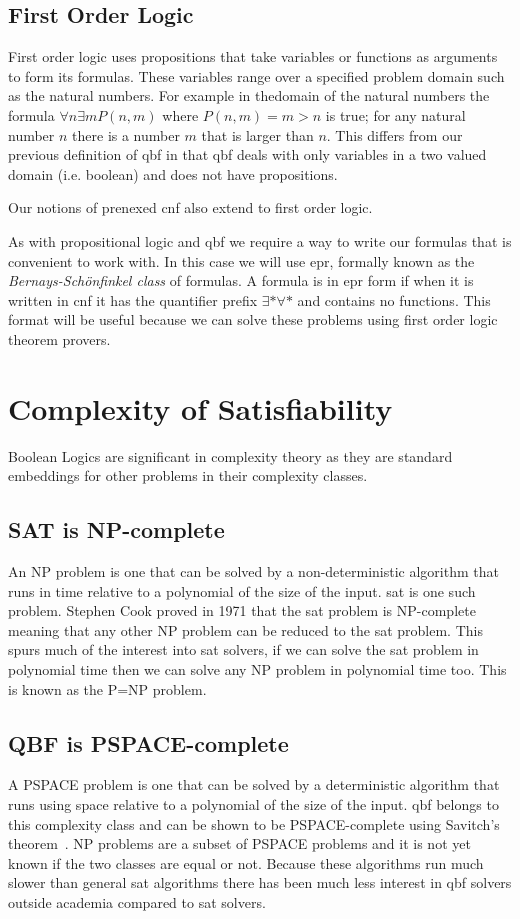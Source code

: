 \subsection{First Order Logic}
First order logic uses propositions that take variables or functions as arguments to form its formulas. These variables range over a specified problem domain such as the natural numbers. For example in thedomain of the natural numbers the formula $\forall n \exists m P(n, m)$ where $P(n, m) = m > n$ is true; for any natural number $n$ there is a number $m$ that is larger than $n$. This differs from our previous definition of \gls{qbf} in that \gls{qbf} deals with only variables in a two valued domain (i.e. boolean) and does not have propositions.

Our notions of prenexed \gls{cnf} also extend to first order logic.

As with propositional logic and \gls{qbf} we require a way to write our formulas that is convenient to work with. In this case we will use \gls{epr}, formally known as the \textit{Bernays-Sch{\"o}nfinkel class} of formulas. A formula is in \gls{epr} form if when it is written in \gls{cnf} it has the quantifier prefix $\exists * \forall *$ and contains no functions. This format will be useful because we can solve these problems using first order logic theorem provers.

\section{Complexity of Satisfiability}
Boolean Logics are significant in complexity theory as they are standard embeddings for other problems in their complexity classes.

\subsection{SAT is NP-complete}
An NP problem is one that can be solved by a non-deterministic algorithm that runs in time relative to a polynomial of the size of the input. \Gls{sat} is one such problem. Stephen Cook proved in 1971 that the \gls{sat} problem is NP-complete~\cite{cookstheorem} meaning that any other NP problem can be reduced to the \gls{sat} problem. This spurs much of the interest into \gls{sat} solvers, if we can solve the \gls{sat} problem in polynomial time then we can solve any NP problem in polynomial time too. This is known as the P=NP problem.

\subsection{QBF is PSPACE-complete}
A PSPACE problem is one that can be solved by a deterministic algorithm that runs using space relative to a polynomial of the size of the input. \Gls{qbf} belongs to this complexity class and can be shown to be PSPACE-complete using Savitch's theorem~\cite{savitch}. NP problems are a subset of PSPACE problems and it is not yet known if the two classes are equal or not. Because these algorithms run much slower than general \gls{sat} algorithms there has been much less interest in \gls{qbf} solvers outside academia compared to \gls{sat} solvers.

